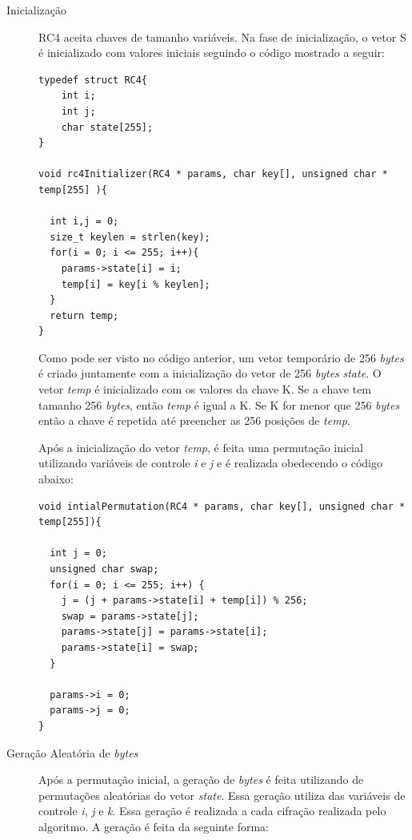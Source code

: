 \begin{description}

	\item [Inicialização] RC4 aceita chaves de tamanho variáveis. Na fase de inicialização, o vetor S é inicializado com valores iniciais seguindo o código mostrado a seguir:
	
    \begin{lstlisting}[caption={Código 
Inicialização}, label=inicialization]
typedef struct RC4{
	int i;
	int j;
	char state[255];
}

void rc4Initializer(RC4 * params, char key[], unsigned char * temp[255] ){

  int i,j = 0;
  size_t keylen = strlen(key);
  for(i = 0; i <= 255; i++){
    params->state[i] = i;
    temp[i] = key[i % keylen];
  }
  return temp;
}
    \end{lstlisting}

Como pode ser visto no código anterior, um vetor temporário de 256 \textit{bytes} é criado juntamente com a inicialização do vetor de 256 \textit{bytes} \textit{state}. O vetor \textit{temp} é inicializado com os valores da chave K. Se a chave tem tamanho 256 \textit{bytes}, então \textit{temp} é igual a K. Se K for menor que 256 \textit{bytes} então a chave é repetida até preencher as 256 posições de \textit{temp}.

Após a inicialização do vetor \textit{temp}, é feita uma permutação inicial utilizando variáveis de controle \textit{i} e \textit{j} e é realizada obedecendo o código abaixo:

    \begin{lstlisting}[caption={Código Permutação Inicial}, label=initialPermutation]
void intialPermutation(RC4 * params, char key[], unsigned char * temp[255]){

  int j = 0;
  unsigned char swap;
  for(i = 0; i <= 255; i++) {
    j = (j + params->state[i] + temp[i]) % 256;
    swap = params->state[j];
    params->state[j] = params->state[i];
    params->state[i] = swap;
  }

  params->i = 0;
  params->j = 0;
}
    \end{lstlisting}

	\item [Geração Aleatória de \textit{bytes}] Após a permutação inicial, a geração de \textit{bytes} é feita utilizando de permutações aleatórias do vetor \textit{state}. Essa geração utiliza das variáveis de controle \textit{i}, \textit{j} e \textit{k}. Essa geração é realizada a cada cifração realizada pelo algoritmo. A geração é feita da seguinte forma:
	

\end{description}
